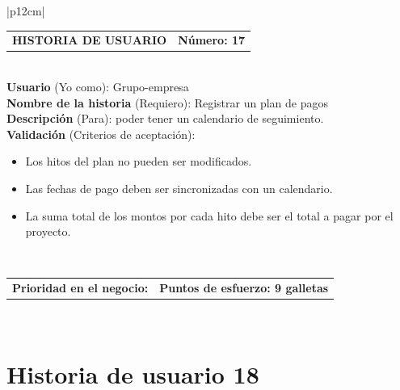 \documentclass[11pt,letterpaper]{report}
\begin{document}
	\begin{center}	
		\begin{tabular}{|p{12cm}|}
			\hline
			\begin{tabular}{c|c}
				\textbf{HISTORIA DE USUARIO} & \textbf{Número: 17} \\
			\end{tabular} \\ \hline
			\textbf{Usuario} (Yo como): Grupo-empresa \\ \hline
			\textbf{Nombre de la historia} (Requiero): Registrar un plan de pagos \\ \hline
			\textbf{Descripción} (Para): poder tener un calendario de seguimiento. \\ \hline
			\textbf{Validación} (Criterios de aceptación): \\
			\begin{minipage}{12cm}
				\begin{itemize}
					\item Los hitos del plan no pueden ser modificados.
					\item Las fechas de pago deben ser sincronizadas con un calendario.
					\item La suma total de los montos por cada hito debe ser el total a pagar por el proyecto.
				\end{itemize}
			\end{minipage} \\ \hline
			\begin{tabular}{p{6cm}|c}
				\textbf{Prioridad en el negocio: } & \textbf{Puntos de esfuerzo: 9 galletas} \\
			\end{tabular} \\ \hline
		\end{tabular}
	\end{center}
	
	\section{Historia de usuario 18}
	
\end{document}
